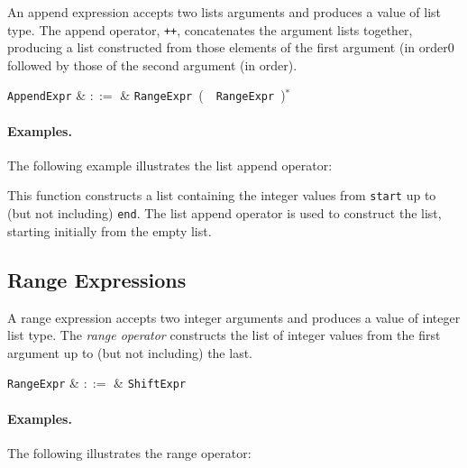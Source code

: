 An append expression accepts two lists arguments and produces a value of list type.  The append operator, \lstinline{++}, concatenates the argument lists together, producing a list constructed from those elements of the first argument (in order0 followed by those of the second argument (in order).

\begin{syntax}
  \verb+AppendExpr+ & $::=$ & \verb+RangeExpr+\ \big(\ \token{++}\
  \verb+RangeExpr+\ \big)$^*$\\
\end{syntax}

\paragraph{Examples.} The following example illustrates the list append operator:



This function constructs a list containing the integer values from \lstinline{start} up to (but not including) \lstinline{end}.  The list append operator is used to construct the list, starting initially from the empty list.


\subsection{Range Expressions}
\label{c_expr_range}

A range expression accepts two integer arguments and produces a value of integer list type.  The {\em range operator} constructs the list of integer values from the first argument up to (but not including) the last.

\begin{syntax}
  \verb+RangeExpr+ & $::=$ & \verb+ShiftExpr+\ \\
\end{syntax}

\paragraph{Examples.}  The following illustrates the range operator:




